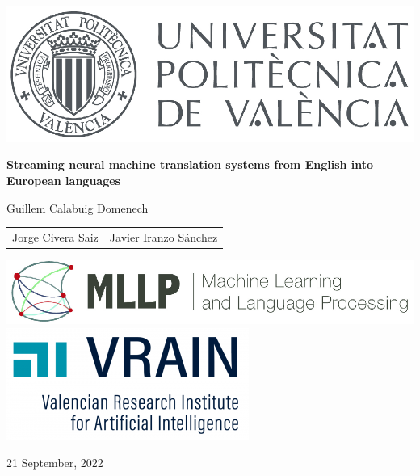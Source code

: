 \documentclass[landscape]{article}
\renewcommand{\today}{21 September, 2022}
\renewcommand{\author}{Guillem Calabuig Domenech}
\renewcommand{\title}{Streaming neural machine translation systems from English into European languages}
\begin{document}
\cp
\thispagestyle{empty}

\begin{center}

\centerline{\includegraphics[height=0.15\textheight]{figures/UPV-logo}}

\rule{0mm}{20mm}
\Large{\Large\textbf{\color{darkred}\title}}

\rule{0mm}{30mm}
{\normalsize \color{greyblue}\author}

\rule{0mm}{0mm}
\begin{table}[ht!]
    \begin{tabularx}{\textwidth}{YY}
        \small \color{greyblue} Jorge Civera Saiz & \small \color{greyblue} Javier Iranzo Sánchez\\
    \end{tabularx}
\end{table}

\end{center}

\centerline{\includegraphics[height=0.12\textheight]{figures/MLLP_Brand} \qquad \qquad \includegraphics[height=0.15\textheight]{figures/vrain.png}}

\normalsize\small
\vspace{10mm}

\centerline{\today}
\vfill
\end{document}
